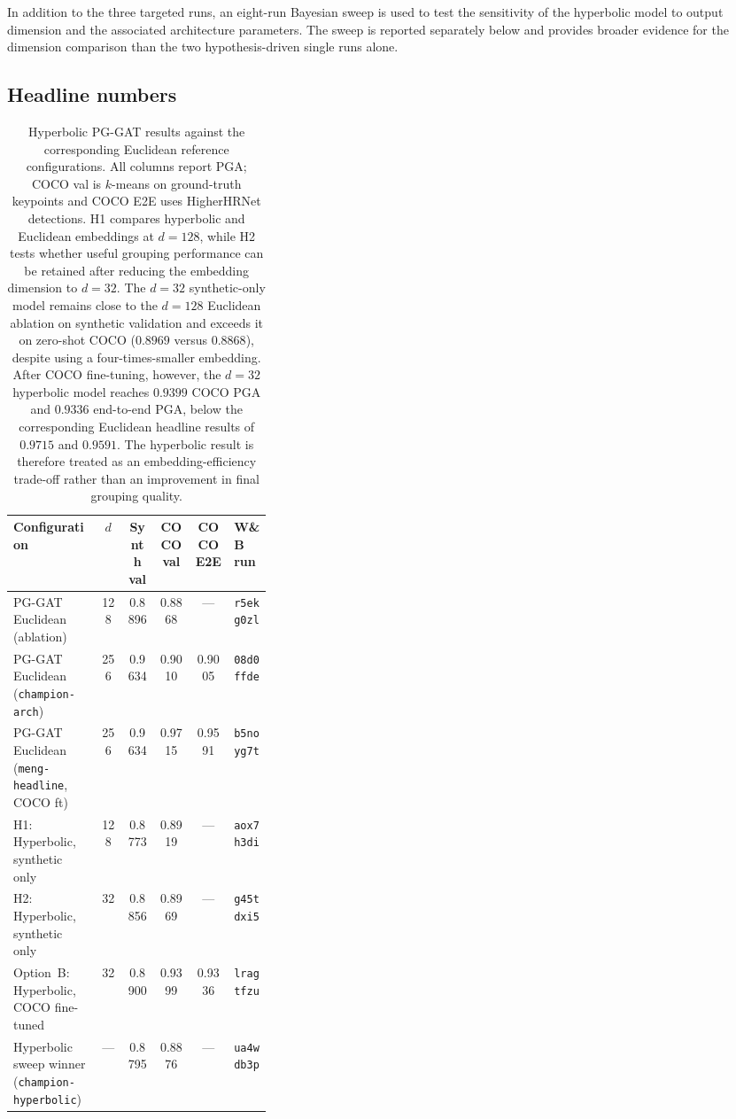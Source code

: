 In addition to the three targeted runs,
an eight-run Bayesian sweep is used to test the sensitivity
of the hyperbolic model to output dimension and the associated
architecture parameters.
The sweep is reported separately below
and provides broader evidence for the dimension comparison than the two
hypothesis-driven single runs alone.

\subsection{Headline numbers}
\label{sec_res_hyperbolic_numbers}

\begin{table}[H]
\centering
\caption[Hyperbolic PG-GAT results against the Euclidean reference configurations.]{Hyperbolic PG-GAT results against the corresponding Euclidean
reference configurations. All columns report PGA; COCO val is $k$-means on
ground-truth keypoints and COCO E2E uses HigherHRNet detections. H1 compares hyperbolic and Euclidean
embeddings at $d=128$, while H2 tests whether useful grouping
performance can be retained after reducing the embedding dimension to
$d=32$. The $d=32$ synthetic-only model remains close to the
$d=128$ Euclidean ablation on synthetic validation and exceeds it on
zero-shot COCO ($0.8969$ versus $0.8868$), despite using a
four-times-smaller embedding. After COCO fine-tuning, however, the
$d=32$ hyperbolic model reaches $0.9399$ COCO PGA and $0.9336$
end-to-end PGA, below the corresponding Euclidean headline results of
$0.9715$ and $0.9591$. The hyperbolic result is therefore treated as an
embedding-efficiency trade-off rather than an improvement in final
grouping quality.}
\label{tab:hyperbolic_headline}
\tablesize
\begin{tabular}{>{\raggedright\arraybackslash}p{0.34\linewidth}ccccl}
\toprule
Configuration
& $d$
& Synth val
& COCO val
& COCO E2E
& W\&B run \\
\midrule
PG-GAT Euclidean (ablation)
    & 128 & 0.8896 & 0.8868 & --- & \texttt{r5ekg0zl} \\
PG-GAT Euclidean (\texttt{champion-arch})
    & 256 & 0.9634 & 0.9010 & 0.9005 & \texttt{08d0ffde} \\
PG-GAT Euclidean (\texttt{meng-headline}, COCO ft)
    & 256 & 0.9634 & 0.9715 & 0.9591 & \texttt{b5noyg7t} \\
\midrule
H1: Hyperbolic, synthetic only
    & 128 & 0.8773 & 0.8919 & --- & \texttt{aox7h3di} \\
H2: Hyperbolic, synthetic only
    & 32 & 0.8856 & 0.8969 & --- & \texttt{g45tdxi5} \\
Option~B: Hyperbolic, COCO fine-tuned
    & 32 & 0.8900 & 0.9399 & 0.9336 & \texttt{lragtfzu} \\
Hyperbolic sweep winner (\texttt{champion-hyperbolic})
    & --- & 0.8795 & 0.8876 & --- & \texttt{ua4wdb3p} \\
\bottomrule
\end{tabular}
\end{table}

